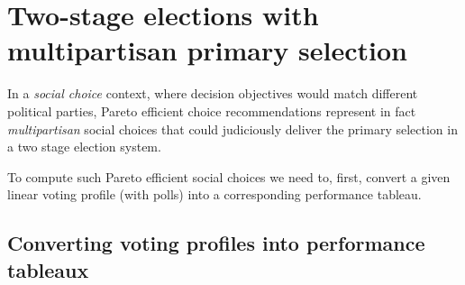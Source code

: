 \chapter{Two-stage elections with multipartisan primary selection}
\label{sec:20}

\abstract*{}

\abstract{}

In a \emph{social choice} context, where decision objectives would match different political parties, Pareto efficient choice recommendations represent in fact \emph{multipartisan} social choices that could judiciously deliver the primary selection in a two stage election system.

To compute such Pareto efficient social choices we need to, first, convert a given linear voting profile (with polls) into a corresponding performance tableau.
 
\section{Converting voting profiles into performance tableaux}
\label{sec:20.1}

